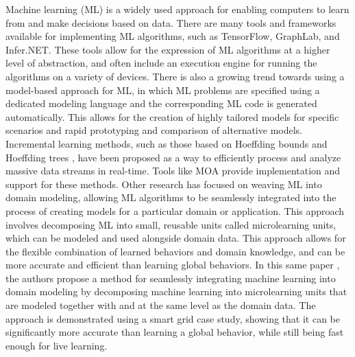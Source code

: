 Machine learning (ML) is a widely used approach for enabling computers to learn from and make decisions based on data. There are many tools and frameworks available for implementing ML algorithms, such as TensorFlow, GraphLab, and Infer.NET. These tools allow for the expression of ML algorithms at a higher level of abstraction, and often include an execution engine for running the algorithms on a variety of devices.
There is also a growing trend towards using a model-based approach for ML, in which ML problems are specified using a dedicated modeling language and the corresponding ML code is generated automatically. This allows for the creation of highly tailored models for specific scenarios and rapid prototyping and comparison of alternative models.
Incremental learning methods, such as those based on Hoeffding bounds and Hoeffding trees \cite{evolutionMDE}, have been proposed as a way to efficiently process and analyze massive data streams in real-time. Tools like MOA provide implementation and support for these methods.
Other research has focused on weaving ML into domain modeling, allowing ML algorithms to be seamlessly integrated into the process of creating models for a particular domain or application. This approach involves decomposing ML into small, reusable units called microlearning units, which can be modeled and used alongside domain data. This approach allows for the flexible combination of learned behaviors and domain knowledge, and can be more accurate and efficient than learning global behaviors. In this same paper \cite{evolutionMDE}, the authors propose a method for seamlessly integrating machine learning into domain modeling by decomposing machine learning into microlearning units that are modeled together with and at the same level as the domain data. The approach is demonstrated using a smart grid case study, showing that it can be significantly more accurate than learning a global behavior, while still being fast enough for live learning.\\


